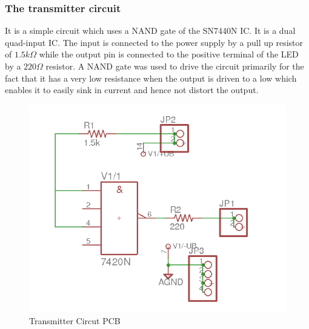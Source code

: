 \documentclass{article}
\begin{document}
\subsubsection{The transmitter circuit}
It is a simple circuit which uses a NAND gate of the SN7440N IC. It is a dual quad-input IC. The input is connected to the power supply by a pull up resistor of $1.5k \Omega$ while the output pin is connected to the positive terminal of the LED by a $220 \Omega $ resistor. A NAND gate was used to drive the circuit primarily for the fact that it has a very low resistance when the output is driven to a low which enables it to easily sink in current and hence not distort the output.
\begin{figure}[h]
  \centering
  \includegraphics[scale=0.5]{images/transmitter_sch}
  \caption{Transmitter Circut PCB}
  \label{fig:tx_circuit}
\end{figure}
\end{document}

